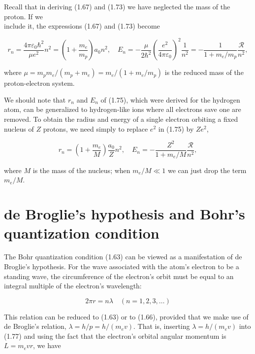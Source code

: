 \documentclass[10pt]{article}
\begin{document}
Recall that in deriving (1.67) and (1.73) we have neglected the mass of the proton. If we\\
include it, the expressions (1.67) and (1.73) become


\begin{equation*}
r_{n}=\frac{4 \pi \varepsilon_{0} \hbar^{2}}{\mu e^{2}} n^{2}=\left(1+\frac{m_{e}}{m_{p}}\right) a_{0} n^{2}, \quad E_{n}=-\frac{\mu}{2 \hbar^{2}}\left(\frac{e^{2}}{4 \pi \varepsilon_{0}}\right)^{2} \frac{1}{n^{2}}=-\frac{1}{1+m_{e} / m_{p}} \frac{\mathcal{R}}{n^{2}}, \tag{1.75}
\end{equation*}


where $\mu=m_{p} m_{e} /\left(m_{p}+m_{e}\right)=m_{e} /\left(1+m_{e} / m_{p}\right)$ is the reduced mass of the proton-electron system.

We should note that $r_{n}$ and $E_{n}$ of (1.75), which were derived for the hydrogen atom, can be generalized to hydrogen-like ions where all electrons save one are removed. To obtain the radius and energy of a single electron orbiting a fixed nucleus of $Z$ protons, we need simply to replace $e^{2}$ in (1.75) by $Z e^{2}$,


\begin{equation*}
r_{n}=\left(1+\frac{m_{e}}{M}\right) \frac{a_{0}}{Z} n^{2}, \quad E_{n}=-\frac{Z^{2}}{1+m_{e} / M} \frac{\mathcal{R}}{n^{2}}, \tag{1.76}
\end{equation*}


where $M$ is the mass of the nucleus; when $m_{e} / M \ll 1$ we can just drop the term $m_{e} / M$.

\section*{de Broglie's hypothesis and Bohr's quantization condition}
The Bohr quantization condition (1.63) can be viewed as a manifestation of de Broglie's hypothesis. For the wave associated with the atom's electron to be a standing wave, the circumference of the electron's orbit must be equal to an integral multiple of the electron's wavelength:


\begin{equation*}
2 \pi r=n \lambda \quad(n=1,2,3, \ldots) \tag{1.77}
\end{equation*}


This relation can be reduced to (1.63) or to (1.66), provided that we make use of de Broglie's relation, $\lambda=h / p=h /\left(m_{e} v\right)$. That is, inserting $\lambda=h /\left(m_{e} v\right)$ into (1.77) and using the fact that the electron's orbital angular momentum is $L=m_{e} v r$, we have
\end{document}
